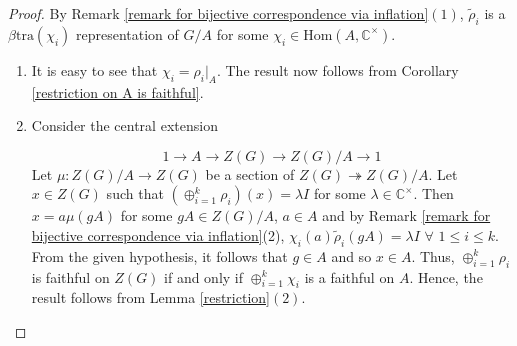 \documentclass[a4paper,11pt]{amsart}
\numberwithin{equation}{section}
\numberwithin{equation}{subsection}
\newcommand{\C}{\mathbb{C}}
\begin{document}
	
	\begin{proof}
		By Remark \ref{remark for bijective correspondence via inflation}$(1)$, $\tilde\rho_i$ is a $\beta\mathrm{tra}(\chi_i)$ representation of $G/A$ for some $\chi_i \in \mathrm{Hom}(A,\mathbb{C}^{\times})$.
		\item 
		\begin{enumerate}
			\item It is easy to see that $\chi_i= \rho_i|_A$. The result now follows from Corollary \ref{restriction on A is faithful}. 
			\item 
			Consider the central extension
			
			\[
			1 \to A \to Z(G) \to Z(G)/A \to 1
			\]
			Let $\mu: Z(G)/A \to Z(G)$ be a section of $Z(G) \twoheadrightarrow Z(G)/A$.
			Let $x \in Z(G)$ such that $(\oplus_{i=1}^k \rho_i)(x)=\lambda I$ for some $\lambda \in \mathbb{C}^{\times}$. Then $x= a\mu(gA)$
			for some $gA \in Z(G)/A$, $a\in A$ and by Remark \ref{remark for bijective correspondence via inflation}(2), $\chi_i(a) \tilde\rho_i(gA) = \lambda I$ $\forall$ $1 \leq i \leq k$. From the given hypothesis, it follows that $g \in A$ and so $x \in A$. Thus, $\oplus_{i=1}^k \rho_i$ is faithful on $Z(G)$ if and only if $\oplus_{i=1}^k \chi_i$ is a faithful on $A$. Hence, the result follows from Lemma \ref{restriction}$(2)$. 
			
		\end{enumerate}
	\end{proof}
	
\end{document}

